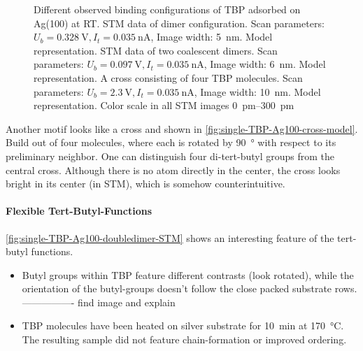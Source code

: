 \begin{figure}[]
{	\label{fig:single-TBP-Ag100-cross-model}
	}
	\caption{Different observed binding configurations of TBP adsorbed on Ag(100) at RT.  STM data of dimer configuration. Scan parameters: $U_b=\SI{0.328}{\volt}, I_t=\SI{0.035}{\nano \ampere}$, Image width: \SI{5}{\nm}.  Model representation.  STM data of two coalescent dimers. Scan parameters: $U_b=\SI{0.097}{\volt}, I_t=\SI{0.035}{\nano \ampere}$, Image width: \SI{6}{\nm}.  Model representation.  A cross consisting of four TBP molecules. Scan parameters: $U_b=\SI{2.3}{\volt}, I_t=\SI{0,035}{\nano \ampere}$, Image width: \SI{10}{\nm}.  Model representation. Color scale in all STM images \SIrange{0}{300}{\pico\meter}}
	\label{fig:single-TBP-Ag100-doubledimer}
\end{figure}
Another motif looks like a cross and shown in \autoref{fig:single-TBP-Ag100-cross-model}. Build out of four molecules, where each is rotated by \SI{90}{\degree} with respect to its preliminary neighbor. One can distinguish four di-tert-butyl groups from the central cross. Although there is no atom directly in the center, the cross looks bright in its center (in STM), which is somehow counterintuitive. 

%

\paragraph{Flexible Tert-Butyl-Functions}
\autoref{fig:single-TBP-Ag100-doubledimer-STM} shows an interesting feature of the tert-butyl functions.

\begin{itemize}
 \item Butyl groups within TBP feature different contrasts (look rotated), while the orientation of the butyl-groups doesn't follow the close packed substrate rows. ---------------- find image and explain
 \item TBP molecules have been heated on silver substrate for \SI{10}{\minute} at \SI{170}{\celsius}. The resulting sample did not feature chain-formation or improved ordering.
\end{itemize}

